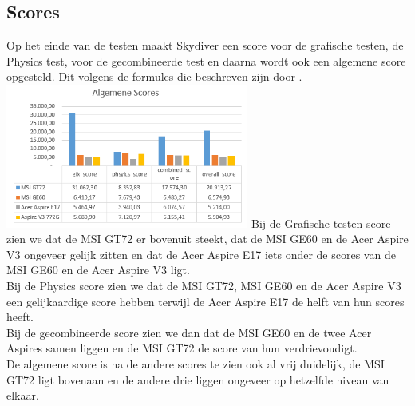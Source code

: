 \subsection{Scores}
Op het einde  van de testen maakt Skydiver een score voor de grafische testen, de Physics test, voor de gecombineerde test en daarna wordt ook een algemene score opgesteld. Dit volgens de formules die beschreven zijn door \cite{3dmark_tech}. \\
\includegraphics[width=8cm]{algemeen}
\vskip 0.1cm
\noindent
Bij de Grafische testen score zien we dat de MSI GT72 er bovenuit steekt, dat de MSI GE60 en de Acer Aspire V3 ongeveer gelijk zitten en dat de Acer Aspire E17 iets onder de scores van de MSI GE60 en de Acer Aspire V3 ligt.\\
Bij de Physics score zien we dat de MSI GT72, MSI GE60 en de Acer Aspire V3 een gelijkaardige score hebben terwijl de Acer Aspire E17 de helft van hun scores heeft.\\
Bij de gecombineerde score zien we dan dat de MSI GE60 en de twee Acer Aspires samen liggen en de MSI GT72 de score van hun verdrievoudigt.\\
De algemene score is na de andere scores te zien ook al vrij duidelijk, de MSI GT72 ligt bovenaan en de andere drie liggen ongeveer op hetzelfde niveau van elkaar.
